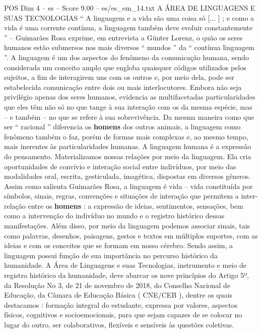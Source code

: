\begin{textsample}{POS Dim 4 – es – Score 9.00 – es/es\_em\_14.txt}  \label{ex:f4_pos_079}
A ÁREA DE LINGUAGENS E SUAS TECNOLOGIAS “ A linguagem e a vida são uma coisa só [... ] ; e como a vida é uma corrente contínua, a linguagem também deve evoluir constantemente ” – Guimarães Rosa exprime, em entrevista a Günter Lorenz, o quão os seres humanos estão submersos nos mais diversos “ mundos ” da “ contínua linguagem ”.
A linguagem é um dos aspectos do fenômeno da comunicação humana, sendo considerada um conceito amplo que engloba quaisquer códigos utilizados pelos sujeitos, a fim de interagirem uns com os outros e, por meio dela, pode ser estabelecida comunicação entre dois ou mais interlocutores.
Embora não seja privilégio apenas dos seres humanos, evidencia as multifacetadas particularidades que eles têm não só no que tange à sua interação com os da mesma espécie, mas – e também – no que se refere à sua sobrevivência.
Da mesma maneira como que ser “ racional ” diferencia os \textbf{homens} dos outros animais, a linguagem como fenômeno também o faz, porém de formas mais complexas e, ao mesmo tempo, mais inerentes às particularidades humanas.
A linguagem humana é a expressão do pensamento.
Materializamos nossas relações por meio da linguagem.
Ela cria oportunidades de convívio e interação social entre indivíduos, por meio das modalidades oral, escrita, gesticulada, imagética, dispostas em diversos gêneros.
Assim como salienta Guimarães Rosa, a linguagem é vida – vida constituída por símbolos, sinais, regras, convenções e situações de interação que permitem a inter-relação entre os \textbf{homens} : a expressão de ideias, sentimentos, sensações, bem como a intervenção do indivíduo no mundo e o registro histórico dessas manifestações.
Além disso, por meio da linguagem podemos associar sinais, tais como palavras, desenhos, paisagens, gestos e textos em múltiplos suportes, com as ideias e com os conceitos que se formam em nosso cérebro.
Sendo assim, a linguagem possui função de sua importância no percurso histórico da humanidade.
A Área de Linguagens e suas Tecnologias, instrumento e meio de registro histórico da humanidade, deve abarcar os nove princípios do Artigo 5º, da Resolução No 3, de 21 de novembro de 2018, do Conselho Nacional de Educação, da Câmara de Educação Básica ( CNE/CEB ), dentre os quais destacamos : formação integral do estudante, expressa por valores, aspectos físicos, cognitivos e socioemocionais, para que sejam capazes de se colocar no lugar do outro, ser colaborativos, flexíveis e sensíveis às questões coletivas.

\end{textsample}
